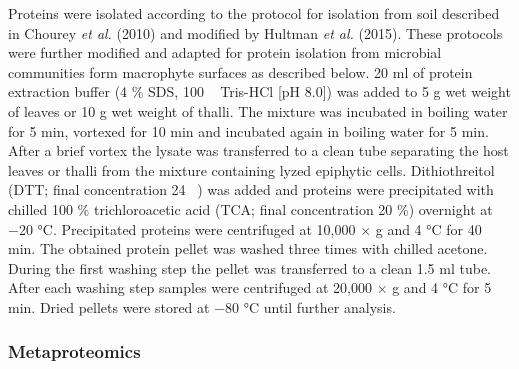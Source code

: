 \documentclass[12pt,]{article}
\begin{document}
Proteins were isolated according to the protocol for isolation from soil
described in Chourey \emph{et al.} (2010) and modified by Hultman
\emph{et al.} (2015). These protocols were further modified and adapted
for protein isolation from microbial communities form macrophyte
surfaces as described below. 20 \si{\ml} of protein extraction buffer (4
\si{\percent} SDS, 100 \si{\milli\Molar} Tris-HCl {[}pH 8.0{]}) was
added to 5 \si{\g} wet weight of leaves or 10 \si{\g} wet weight of
thalli. The mixture was incubated in boiling water for 5 \si{\minute},
vortexed for 10 \si{\minute} and incubated again in boiling water for 5
\si{\minute}. After a brief vortex the lysate was transferred to a clean
tube separating the host leaves or thalli from the mixture containing
lyzed epiphytic cells. Dithiothreitol (DTT; final concentration 24
\si{\milli\Molar}) was added and proteins were precipitated with chilled
100 \si{\percent} trichloroacetic acid (TCA; final concentration 20
\si{\percent}) overnight at \num{-20} °C. Precipitated proteins were
centrifuged at 10,000 × g and 4 \si{\degreeCelsius} for 40 \si{\minute}.
The obtained protein pellet was washed three times with chilled acetone.
During the first washing step the pellet was transferred to a clean 1.5
\si{\ml} tube. After each washing step samples were centrifuged at
20,000 × g and 4 \si{\degreeCelsius} for 5 \si{\minute}. Dried pellets
were stored at \num{-80} °C until further analysis.

\subsubsection{Metaproteomics}\label{metaproteomics}
\end{document}

